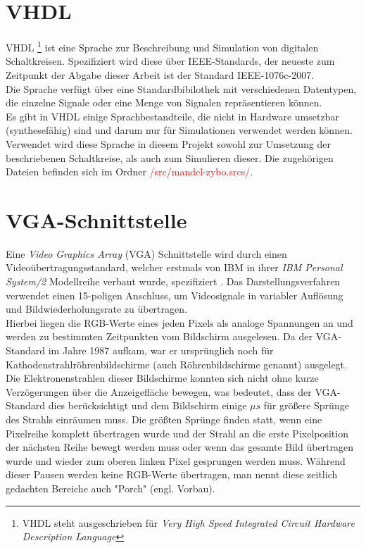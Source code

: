 \documentclass[a4paper,12pt,onesided]{report}
\begin{document}
\section{VHDL}
\label{sec:vhdl}
VHDL \footnote{VHDL steht ausgeschrieben für \textit{Very High Speed Integrated Circuit Hardware Description Language}} ist eine Sprache zur Beschreibung und Simulation von digitalen Schaltkreisen.
Spezifiziert wird diese über IEEE-Standards, der neueste zum Zeitpunkt der Abgabe dieser Arbeit ist der Standard IEEE-1076c-2007\cite{ieeevhdl}.\\
Die Sprache verfügt über eine Standardbibilothek mit verschiedenen Datentypen, die einzelne Signale oder eine Menge von Signalen repräsentieren können.\\
Es gibt in VHDL einige Sprachbestandteile, die nicht in Hardware umsetzbar (synthesefähig) sind und darum nur für Simulationen verwendet werden können.
Verwendet wird diese Sprache in diesem Projekt sowohl zur Umsetzung der beschriebenen Schaltkreise, als auch zum Simulieren dieser.
Die zugehörigen Dateien befinden sich im Ordner \textcolor{red}{/src/mandel-zybo.srcs/}.

\section{VGA-Schnittstelle}
\label{sec:vga}
Eine \textit{Video Graphics Array} (VGA) Schnittstelle wird durch einen Videoübertragungsstandard, welcher erstmals von IBM in ihrer \textit{IBM Personal System/2} Modellreihe verbaut wurde, spezifiziert \cite{ibmTimeline}. 
Das Darstellungsverfahren verwendet einen 15-poligen Anschluss, um Videosignale in variabler Auflösung und Bildwiederholungsrate zu übertragen.\\
Hierbei liegen die RGB-Werte eines jeden Pixels als analoge Spannungen an und werden zu bestimmten Zeitpunkten vom Bildschirm ausgelesen. 
Da der VGA-Standard im Jahre 1987 aufkam, war er ursprünglich noch für  Kathodenstrahlröhrenbildschirme (auch Röhrenbildschirme genannt) ausgelegt. 
Die Elektronenstrahlen dieser Bildschirme konnten sich nicht ohne kurze Verzögerungen über die Anzeigefläche bewegen, was bedeutet, dass der VGA-Standard dies berücksichtigt und dem Bildschirm einige $\mu s$ für größere Sprünge des Strahls einräumen muss.
Die größten Sprünge finden statt, wenn eine Pixelreihe komplett übertragen wurde und der Strahl an die erste Pixelposition der nächsten Reihe bewegt werden muss oder wenn das gesamte Bild übertragen wurde und wieder zum oberen linken Pixel gesprungen werden muss.
Während dieser Pausen werden keine RGB-Werte übertragen, man nennt diese zeitlich gedachten Bereiche auch "Porch" (engl. Vorbau).\\
\end{document}
